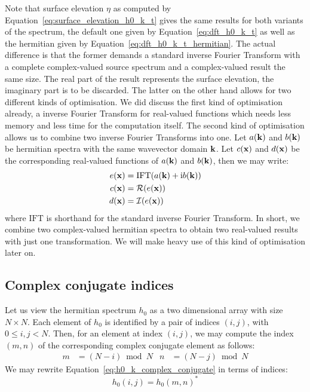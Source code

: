 Note that surface elevation $\eta$ as computed by Equation~\ref{eq:surface_elevation_h0_k_t}
gives the same results for both variants of the spectrum, the default one given by
Equation~\ref{eq:dft_h0_k_t} as well as the hermitian given by Equation~\ref{eq:dft_h0_k_t_hermitian}.
The actual difference is that the former demands a standard inverse Fourier Transform with
a complete complex-valued source spectrum and a complex-valued result the same size. The real part
of the result represents the surface elevation, the imaginary part is to be discarded.
The latter on the other hand allows for two different kinds of optimisation. We did discuss
the first kind of optimisation already, a inverse Fourier Transform for real-valued
functions which needs less memory and less time for the computation itself. The second kind
of optimisation allows us to combine two inverse Fourier Transforms into one. Let $a(\mathbf{k})$
and $b(\mathbf{k})$ be hermitian spectra with the same wavevector domain $\mathbf{k}$. Let $c(\mathbf{x})$
and $d(\mathbf{x})$ be the corresponding real-valued functions of $a(\mathbf{k})$ and $b(\mathbf{k})$,
then we may write:
\begin{align}
\label{eq:idft_combined}
 e(\mathbf{x}) &= \mathrm{IFT}(a(\mathbf{k})+\mathrm{i}b(\mathbf{k})) \\
 c(\mathbf{x}) &= \mathcal{R}(e(\mathbf{x})) \\
 d(\mathbf{x}) &= \mathcal{I}(e(\mathbf{x})) 
\end{align}
where $\mathrm{IFT}$ is shorthand for the standard inverse Fourier Transform. In short, we combine
two complex-valued hermitian spectra to obtain two real-valued results with just one transformation.
We will make heavy use of this kind of optimisation later on.\\

\subsection{Complex conjugate indices}

Let us view the hermitian spectrum $h_0$ as a two dimensional array with size $N \times N$.
Each element of $h_0$ is identified by a pair of indices $(i,j)$, with $0\leq i,j <N$. Then, for
an element at index $(i,j)$, we may compute the index $(m,n)$ of the corresponding complex
conjugate element as follows:
\begin{align}
m &= (N - i)\bmod N & n &= (N - j)\bmod N
\end{align}
We may rewrite Equation~\ref{eq:h0_k_complex_conjugate} in terms of indices:
\begin{equation}
 h_0(i,j) = h_0(m,n)^*
\end{equation}

